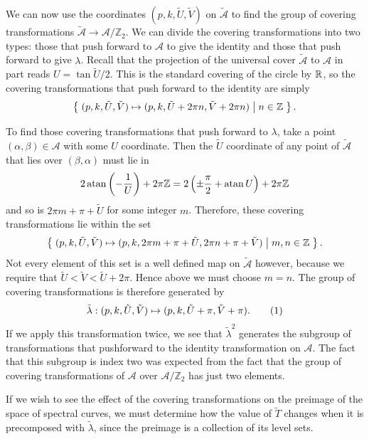 \documentclass{article}
\begin{document}
We can now use the coordinates $(p,k,\tilde{U},\tilde{V})$ on $\mathcal{\tilde{A}}$ to find the group of covering transformations $\mathcal{\tilde{A}} \to \mathcal{A}/\mathbb{Z}_2$. We can divide the covering transformations into two types: those that push forward to $\mathcal{A}$ to give the identity and those that push forward to give $\lambda$. Recall that the projection of the universal cover $\mathcal{\tilde{A}}$ to $\mathcal{A}$ in part reads $U = \tan \tilde{U}/2$. This is the standard covering of the circle by $\mathbb{R}$, so the covering transformations that push forward to the identity are simply
\[
\left\{\;  (p,k,\tilde{U},\tilde{V}) \mapsto (p,k,\tilde{U} + 2\pi n,\tilde{V} +2\pi n)  \;\middle|\;  n \in \mathbb{Z}  \;\right\}.
\]

To find those covering transformations that push forward to $\lambda$, take a point $(\alpha,\beta) \in \mathcal{A}$ with some $U$ coordinate. Then the $\tilde{U}$ coordinate of any point of $\mathcal{\tilde{A}}$ that lies over $(\beta,\alpha)$ must lie in
\[
2\operatorname{atan} \left( -\frac{1}{U} \right) + 2\pi\mathbb{Z}
= 2\left(\pm\frac{\pi}{2} + \operatorname{atan} U\right) + 2\pi\mathbb{Z}
\]
and so is $2\pi m + \pi + \tilde{U}$ for some integer $m$. Therefore, these covering transformations lie within the set
\[
\left\{\; (p,k,\tilde{U},\tilde{V}) \mapsto (p,k, 2\pi m + \pi + \tilde{U}, 2\pi n + \pi + \tilde{V}) \;\middle|\; m,n \in \mathbb{Z} \;\right\}.
\]
Not every element of this set is a well defined map on $\mathcal{\tilde{A}}$ however, because we require that $\tilde{U} < \tilde{V} < \tilde{U} + 2\pi$. Hence above we must choose $m=n$. The group of covering transformations is therefore generated by
\[
\tilde{\lambda} : (p,k,\tilde{U},\tilde{V}) \mapsto (p,k, \tilde{U} + \pi, \tilde{V} + \pi).
\labelthis{eqn:tilde lambda action}
\]
If we apply this transformation twice, we see that $\tilde{\lambda}^2$ generates the subgroup of transformations that pushforward to the identity transformation on $\mathcal{A}$. The fact that  this subgroup is index two was expected from the fact that the group of covering transformations of $\mathcal{A}$ over $\mathcal{A}/\mathbb{Z}_2$ has just two elements.






If we wish to see the effect of the covering transformations on the preimage of the space of spectral curves, we must determine how the value of $\tilde{T}$ changes when it is precomposed with $\tilde{\lambda}$, since the preimage is a collection of its level sets.
\end{document}
